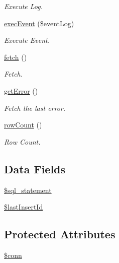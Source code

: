 \begin{DoxyCompactItemize}
\begin{DoxyCompactList}\small\item\em \-Execute \-Log. \end{DoxyCompactList}\item 
\hyperlink{classdb_helper_ac1876160b600b359a60fd5aad7edba09}{exec\-Event} (\$event\-Log)
\begin{DoxyCompactList}\small\item\em \-Execute \-Event. \end{DoxyCompactList}\item 
\hyperlink{classdb_helper_ae48cc10bd727774bb36203986ce3b176}{fetch} ()
\begin{DoxyCompactList}\small\item\em \-Fetch. \end{DoxyCompactList}\item 
\hyperlink{classdb_helper_a24ada5decce3d1b79cd82f5a90ccf404}{get\-Error} ()
\begin{DoxyCompactList}\small\item\em \-Fetch the last error. \end{DoxyCompactList}\item 
\hyperlink{classdb_helper_a82b073888555fc72e57142fe913db377}{row\-Count} ()
\begin{DoxyCompactList}\small\item\em \-Row \-Count. \end{DoxyCompactList}\end{DoxyCompactItemize}
\subsection*{\-Data \-Fields}
\begin{DoxyCompactItemize}
\item 
\hyperlink{classdb_helper_a29c1e591b4e284bca5ae38ed00eea5a9}{\$sql\-\_\-statement}
\item 
\hyperlink{classdb_helper_ae4ac788f919cb92f528ab1455e8a3e6b}{\$last\-Insert\-Id}
\end{DoxyCompactItemize}
\subsection*{\-Protected \-Attributes}
\begin{DoxyCompactItemize}
\item 
\hyperlink{classdb_helper_aa8a5a87b9c1a6a0819b88447cbe41877}{\$conn}
\end{DoxyCompactItemize}


